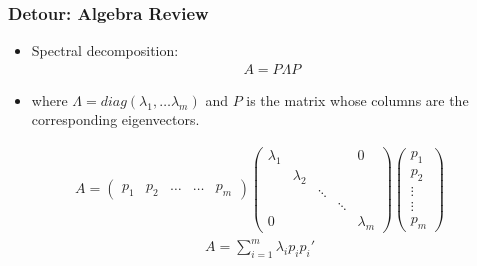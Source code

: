 \documentclass[
  shownotes,
  xcolor={svgnames},
  hyperref={colorlinks,citecolor=DarkBlue,linkcolor=DarkRed,urlcolor=DarkBlue}
  , aspectratio=169]{beamer}
\begin{document}
\begin{frame}
\frametitle{Detour: Algebra Review}
\begin{itemize}
\item Spectral decomposition: 
\medskip
\begin{align}
A = P\Lambda P
\end{align}
 
\item where $\Lambda = diag(\lambda_1, \dots \lambda_m )$ and $P$ is the matrix whose columns are the corresponding eigenvectors.
\end{itemize}
\begin{align}
A=\left(\begin{array}{ccccc}
p_{1} & p_{2} & \dots & \dots & p_{m}\end{array}\right)\left(\begin{array}{ccccc}
\lambda_{1} &  &  &  & 0\\
 & \lambda_{2}\\
 &  & \ddots\\
 &  &  & \ddots\\
0 &  &  &  & \lambda_{m}
\end{array}\right)\left(\begin{array}{c}
p_{1}\\
p_{2}\\
\vdots\\
\vdots\\
p_{m}
\end{array}\right)
\end{align}
\begin{align}
A=\sum_{i=1}^{m}\lambda_{i}p_{i}p_{i}'
\end{align}

\end{frame}

\end{document}
